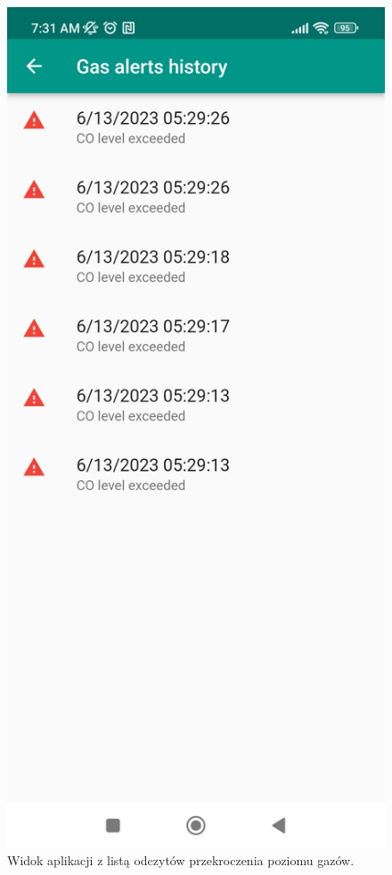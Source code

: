 \documentclass[a4paper, 11pt]{article}
\begin{document}
\begin{figure}
\begin{center}
\includegraphics[width=0.6\linewidth]{co.jpg}
\caption{Widok aplikacji z listą odczytów przekroczenia poziomu gazów.}
\end{center}
\end{figure}
\end{document}
